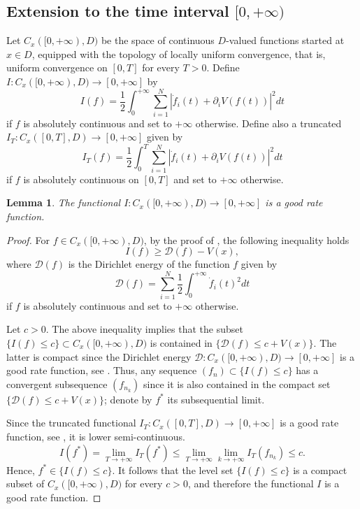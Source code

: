 \documentclass[11pt]{article}
\numberwithin{equation}{section}
\newtheorem{lemma}[theorem]{Lemma}
\theoremstyle{definition}
\begin{document}
\subsection{Extension to the time interval \texorpdfstring{$[0,+\infty)$}{[0,+∞)}}
Let $C_{x}([0,+\infty),D)$ be the space of continuous $D$-valued functions started at $x\in D$, equipped with the topology of locally uniform convergence, that is, uniform convergence on $[0,T]$ for every $T>0$.
Define $I:C_{x}([0,+\infty),D)\to[0,+\infty]$ by
\[
    I(f) = \frac{1}{2}\int_{0}^{+\infty}\sum\limits_{i=1}^{N}\left|\dot f_{i}(t) + \partial_{i} V(f(t))\right|^2dt
\]
if $f$ is absolutely continuous and set to $+\infty$ otherwise. Define also a truncated $I_{T}:C_{x}([0,T],D)\to[0,+\infty]$ given by 
\[
    I_{T}(f) = \frac{1}{2}\int_{0}^{T}\sum\limits_{i=1}^{N}\left|\dot f_{i}(t) + \partial_{i} V(f(t))\right|^2dt
\]
if $f$ is absolutely continuous on $[0,T]$ and set to $+\infty$ otherwise.

\begin{lemma}\label{lem::good_rate_function}
The functional $I:C_{x}([0,+\infty),D)\to[0,+\infty]$ is a good rate function.
\end{lemma}
\begin{proof}
For $f\in C_{x}([0,+\infty), D)$, by the proof of \cite[Corollary 2.13]{abuzaid2024large},  the following inequality holds
\[
    I(f)\ge \mathcal{D}(f)-V(x),
\]
where $\mathcal{D}(f)$ is the Dirichlet energy of the function $f$ given by 
\[
    \mathcal{D}(f) = \sum\limits_{i=1}^{N}\frac{1}{2}\int_{0}^{+\infty}\dot f_{i}(t)^2dt
\]
if $f$ is absolutely continuous and set to $+\infty$ otherwise. 

Let $c>0$. The above inequality implies that the subset $\{I(f)\le c \} \subset C_{x}([0,+\infty), D)$ is contained in $\{\mathcal{D}(f)\le c + V(x)\}$. The latter is compact since the Dirichlet energy $\mathcal{D}:C_{x}([0,+\infty), D)\to [0,+\infty]$ is a good rate function, see \cite[Chapter ??]{dembo2009large}. Thus, any sequence $(f_{n})\subset \{I(f)\le c \}$ has a convergent subsequence $(f_{n_{k}})$ since it is also contained in the compact set $\{\mathcal{D}(f)\le c + V(x)\}$; denote by $f^*$ its subsequential limit. 

Since the truncated functional $I_{T}:C_{x}([0,T],D)\to[0,+\infty]$ is a good rate function, see \cite[Lemma 2.15]{abuzaid2024large}, it is lower semi-continuous. 
\[ 
    I(f^{*}) = \lim \limits_{T\to+\infty}I_{T}(f^{*}) \le  \lim \limits_{T\to+\infty} \lim\limits_{k\to+\infty} I_{T}(f_{n_{k}})\le c.
\]
Hence, $f^*\in \{I(f)\le c\}$. It follows that the level set $\{I(f)\le c\}$ is a compact subset of $C_{x}([0,+\infty), D)$ for every $c>0$, and therefore the functional $I$ is a good rate function.
\end{proof}
\end{document}
